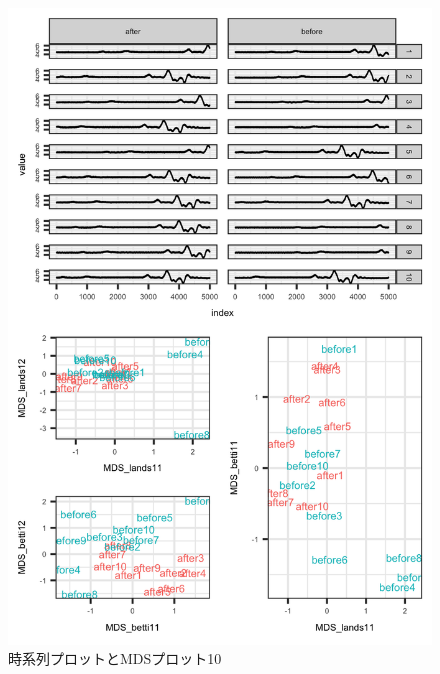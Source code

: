 \documentclass{jarticle}
\begin{document}
\begin{figure}[H]
	\begin{center}
		\includegraphics[width=15cm]{fig/MDS_plot10.png}
		\caption{時系列プロットとMDSプロット10}
		\label{fig:MDS_plot10}
	\end{center}
\end{figure}
\end{document}

